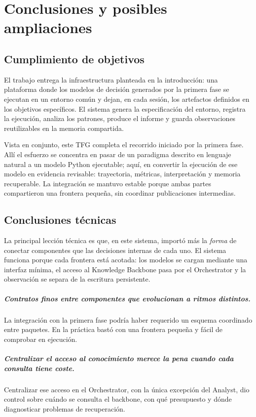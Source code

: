 \chapter{Conclusiones y posibles ampliaciones}

\section{Cumplimiento de objetivos}

El trabajo entrega la infraestructura planteada en la introducción: una
plataforma donde los modelos de decisión generados por la primera fase se
ejecutan en un entorno común y dejan, en cada sesión, los artefactos definidos
en los objetivos específicos. El sistema genera la especificación del entorno,
registra la ejecución, analiza los patrones, produce el informe y guarda
observaciones reutilizables en la memoria compartida.

Vista en conjunto, este TFG completa el recorrido iniciado por la primera fase.
Allí el esfuerzo se concentra en pasar de un paradigma descrito en
lenguaje natural a un modelo Python ejecutable; aquí, en convertir la ejecución
de ese modelo en evidencia revisable: trayectoria, métricas, interpretación y
memoria recuperable. La integración se mantuvo estable porque ambas partes
compartieron una frontera pequeña, sin coordinar publicaciones intermedias.

\section{Conclusiones técnicas}

La principal lección técnica es que, en este sistema, importó más la
\emph{forma} de conectar componentes que las decisiones internas de cada uno.
El sistema funciona porque cada frontera está acotada: los modelos se
cargan mediante una interfaz mínima, el acceso al Knowledge Backbone pasa por
el Orchestrator y la observación se separa de la escritura persistente.

\paragraph{Contratos finos entre componentes que evolucionan a ritmos
distintos.} La integración con la primera fase podría haber requerido un
esquema coordinado entre paquetes. En la práctica bastó con una frontera
pequeña y fácil de comprobar en ejecución.

\paragraph{Centralizar el acceso al conocimiento merece la pena cuando
cada consulta tiene coste.} Centralizar ese acceso en el Orchestrator, con la
única excepción del Analyst, dio control sobre cuándo se consulta el backbone,
con qué presupuesto y dónde diagnosticar problemas de recuperación.

